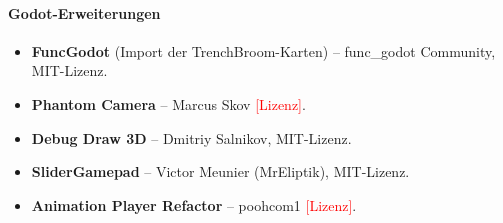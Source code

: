\documentclass[../Main.tex]{subfiles}
\begin{document}
\paragraph{Godot-Erweiterungen}
\begin{itemize}[leftmargin=1.5cm]
\item \textbf{FuncGodot} (Import der TrenchBroom-Karten) -- func\_godot Community, MIT-Lizenz.
\item \textbf{Phantom Camera} -- Marcus Skov \textcolor{red}{[Lizenz]}.
\item \textbf{Debug Draw 3D} -- Dmitriy Salnikov, MIT-Lizenz.
\item \textbf{SliderGamepad} -- Victor Meunier (MrEliptik), MIT-Lizenz.
\item \textbf{Animation Player Refactor} -- poohcom1 \textcolor{red}{[Lizenz]}.
\end{itemize}
\end{document}
